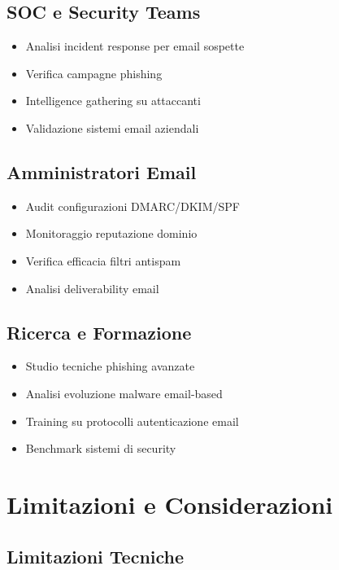 \documentclass{article}
\begin{document}
\subsection{SOC e Security Teams}

\begin{itemize}
    \item Analisi incident response per email sospette
    \item Verifica campagne phishing
    \item Intelligence gathering su attaccanti
    \item Validazione sistemi email aziendali
\end{itemize}

\subsection{Amministratori Email}

\begin{itemize}
    \item Audit configurazioni DMARC/DKIM/SPF
    \item Monitoraggio reputazione dominio
    \item Verifica efficacia filtri antispam
    \item Analisi deliverability email
\end{itemize}

\subsection{Ricerca e Formazione}

\begin{itemize}
    \item Studio tecniche phishing avanzate
    \item Analisi evoluzione malware email-based
    \item Training su protocolli autenticazione email
    \item Benchmark sistemi di security
\end{itemize}

\section{Limitazioni e Considerazioni}

\subsection{Limitazioni Tecniche}
\end{document}
